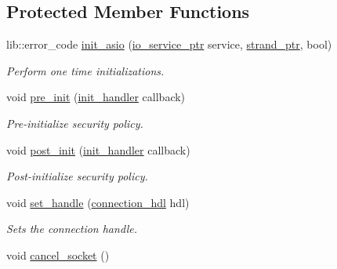 \subsection*{Protected Member Functions}
\begin{DoxyCompactItemize}
\item 
lib\+::error\+\_\+code \hyperlink{classwebsocketpp_1_1transport_1_1asio_1_1basic__socket_1_1connection_ac458885eaebea790795dbe5e7ab62dc9}{init\+\_\+asio} (\hyperlink{classwebsocketpp_1_1transport_1_1asio_1_1basic__socket_1_1connection_a2fbedcf43a5be7b7e4abda534828260b}{io\+\_\+service\+\_\+ptr} service, \hyperlink{classwebsocketpp_1_1transport_1_1asio_1_1basic__socket_1_1connection_a5476ae9ce5c53ecb57a3dfd8326f4f33}{strand\+\_\+ptr}, bool)
\begin{DoxyCompactList}\small\item\em Perform one time initializations. \end{DoxyCompactList}\item 
void \hyperlink{classwebsocketpp_1_1transport_1_1asio_1_1basic__socket_1_1connection_ab49994bd223b8d0a2eaa11d0029a1b78}{pre\+\_\+init} (\hyperlink{namespacewebsocketpp_1_1transport_aeae75e675c1a334b3b33ab7120b480a5}{init\+\_\+handler} callback)
\begin{DoxyCompactList}\small\item\em Pre-\/initialize security policy. \end{DoxyCompactList}\item 
void \hyperlink{classwebsocketpp_1_1transport_1_1asio_1_1basic__socket_1_1connection_abeee4b73e1f47d21dd42e455f1272d64}{post\+\_\+init} (\hyperlink{namespacewebsocketpp_1_1transport_aeae75e675c1a334b3b33ab7120b480a5}{init\+\_\+handler} callback)
\begin{DoxyCompactList}\small\item\em Post-\/initialize security policy. \end{DoxyCompactList}\item 
void \hyperlink{classwebsocketpp_1_1transport_1_1asio_1_1basic__socket_1_1connection_aac8318bcf892664a4f66a1f1435ed5ce}{set\+\_\+handle} (\hyperlink{namespacewebsocketpp_a6b3d26a10ee7229b84b776786332631d}{connection\+\_\+hdl} hdl)
\begin{DoxyCompactList}\small\item\em Sets the connection handle. \end{DoxyCompactList}\item 
void \hyperlink{classwebsocketpp_1_1transport_1_1asio_1_1basic__socket_1_1connection_abfaf5f93e1f292e2fc96e708627b5bea}{cancel\+\_\+socket} ()\hypertarget{classwebsocketpp_1_1transport_1_1asio_1_1basic__socket_1_1connection_abfaf5f93e1f292e2fc96e708627b5bea}{}\label{classwebsocketpp_1_1transport_1_1asio_1_1basic__socket_1_1connection_abfaf5f93e1f292e2fc96e708627b5bea}


\end{DoxyCompactItemize}

